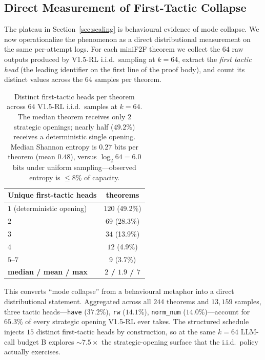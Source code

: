 \documentclass{article}
\begin{document}
\subsection{Direct Measurement of First-Tactic Collapse}
\label{sec:first_tactic}

The plateau in Section~\ref{sec:scaling} is behavioural evidence of mode collapse. We now operationalize the phenomenon as a direct distributional measurement on the same per-attempt logs. For each miniF2F theorem we collect the $64$ raw outputs produced by V1.5-RL i.i.d.\ sampling at $k{=}64$, extract the \emph{first tactic head} (the leading identifier on the first line of the proof body), and count its distinct values across the $64$ samples per theorem.

\begin{table}[t]
\centering
\small
\begin{tabular}{lc}
\toprule
\textbf{Unique first-tactic heads} & \textbf{theorems} \\
\midrule
$1$ (deterministic opening) & $120$ (49.2\%) \\
$2$ & $69$ (28.3\%) \\
$3$ & $34$ (13.9\%) \\
$4$ & $12$ (4.9\%) \\
$5$--$7$ & $9$ (3.7\%) \\
\midrule
\textbf{median / mean / max} & \textbf{$2$ / $1.9$ / $7$} \\
\bottomrule
\end{tabular}
\caption{Distinct first-tactic heads per theorem across $64$ V1.5-RL i.i.d.\ samples at $k{=}64$. The median theorem receives only $2$ strategic openings; nearly half ($49.2\%$) receives a deterministic single opening. Median Shannon entropy is $0.27$ bits per theorem (mean $0.48$), versus $\log_2 64 = 6.0$ bits under uniform sampling---observed entropy is $\le 8\%$ of capacity.}
\label{tab:first_tactic}
\end{table}

This converts ``mode collapse'' from a behavioural metaphor into a direct distributional statement. Aggregated across all $244$ theorems and $13{,}159$ samples, three tactic heads---\texttt{have} ($37.2\%$), \texttt{rw} ($14.1\%$), \texttt{norm\_num} ($14.0\%$)---account for $65.3\%$ of every strategic opening V1.5-RL ever takes. The structured schedule injects $15$ distinct first-tactic heads by construction, so at the same $k{=}64$ LLM-call budget B explores $\sim$$7.5\times$ the strategic-opening surface that the i.i.d.\ policy actually exercises.
\end{document}
